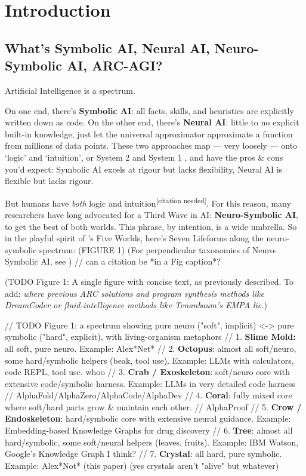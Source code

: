\documentclass{article}
\begin{document}
\section{Introduction}

\subsection{What's Symbolic AI, Neural AI, Neuro-Symbolic AI, ARC-AGI?}

Artificial Intelligence is a spectrum.

On one end, there's \textbf{Symbolic AI}: all facts, skills, and heuristics are explicitly written down as code. On the other end, there's \textbf{Neural AI}: little to no explicit built-in knowledge, just let the universal approximator \citep{universal_approximation} approximate a function from millions of data points. These two approaches map — very loosely — onto `logic' and `intuition', or System 2 and System 1 \citep{thinking_fast_and_slow}, and have the pros \& cons you'd expect: Symbolic AI excels at rigour but lacks flexibility, Neural AI is flexible but lacks rigour.

But humans have \textit{both} logic and intuition\textsuperscript{[citation needed]}. For this reason, many researchers \citep{algebraic_mind,neuro_sym_fdn,bengio_1_to_2,third_ai_summer,third_ai_wave} have long advocated for a Third Wave in AI: \textbf{Neuro-Symbolic AI}, to get the best of both worlds. This phrase, by intention, is a wide umbrella. So in the playful spirit of \citet{five_worlds}'s Five Worlds, here's Seven Lifeforms along the neuro-symbolic spectrum: (FIGURE 1) (For perpendicular taxonomies of Neuro-Symbolic AI, see \citet{third_ai_summer, third_ai_wave}) // can a citation be *in a Fig caption*?

(TODO Figure 1: A single figure with concise text, as previously described. To add: \textit{where previous ARC solutions and program synthesis methods like DreamCoder or fluid-intelligence methods like Tenanbaum's EMPA lie.})

// TODO Figure 1: a spectrum showing pure neuro ("soft", implicit) <-> pure symbolic ("hard", explicit), with living-organism metaphors
// 1. \textbf{Slime Mold:} all soft, pure neuro. Example: Alex*Net*
// 2. \textbf{Octopus}: almost all soft/neuro, some hard/symbolic helpers (beak, tool use). Example: LLMs with calculators, code REPL, tool use. whoo
// 3. \textbf{Crab / Exoskeleton}: soft/neuro core with extensive code/symbolic harness. Example: LLMs in very detailed code harness // AlphaFold/AlphaZero/AlphaCode/AlphaDev
// 4. \textbf{Coral}: fully mixed core where soft/hard parts grow \& maintain each other. // AlphaProof
// 5. \textbf{Crow / Endoskeleton}: hard/symbolic core with extensive neural guidance. Example: Embedding-based Knowledge Graphs for drug discovery
// 6. \textbf{Tree}: almost all hard/symbolic, some soft/neural helpers (leaves, fruits). Example: IBM Watson, Google's Knowledge Graph I think?
// 7. \textbf{Crystal}: all hard, pure symbolic. Example: Alex*Not* (this paper) (yes crystals aren't "alive" but whatever)
\end{document}
